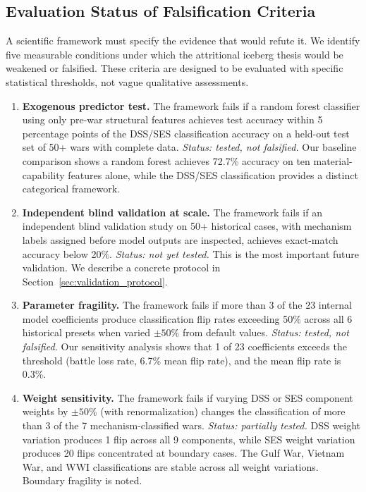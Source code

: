 \subsection{Evaluation Status of Falsification Criteria}\label{sec:falsification_status}

A scientific framework must specify the evidence that would refute it. We identify five measurable conditions under which the attritional iceberg thesis would be weakened or falsified. These criteria are designed to be evaluated with specific statistical thresholds, not vague qualitative assessments.

\begin{enumerate}
    \item \textbf{Exogenous predictor test.} The framework fails if a random forest classifier using only pre-war structural features achieves test accuracy within 5 percentage points of the DSS/SES classification accuracy on a held-out test set of 50+ wars with complete data. \textit{Status: tested, not falsified.} Our baseline comparison shows a random forest achieves 72.7\% accuracy on ten material-capability features alone, while the DSS/SES classification provides a distinct categorical framework.

    \item \textbf{Independent blind validation at scale.} The framework fails if an independent blind validation study on 50+ historical cases, with mechanism labels assigned before model outputs are inspected, achieves exact-match accuracy below 20\%. \textit{Status: not yet tested.} This is the most important future validation. We describe a concrete protocol in Section~\ref{sec:validation_protocol}.

    \item \textbf{Parameter fragility.} The framework fails if more than 3 of the 23 internal model coefficients produce classification flip rates exceeding 50\% across all 6 historical presets when varied $\pm 50\%$ from default values. \textit{Status: tested, not falsified.} Our sensitivity analysis shows that 1 of 23 coefficients exceeds the threshold (battle loss rate, 6.7\% mean flip rate), and the mean flip rate is 0.3\%.

    \item \textbf{Weight sensitivity.} The framework fails if varying DSS or SES component weights by $\pm 50\%$ (with renormalization) changes the classification of more than 3 of the 7 mechanism-classified wars. \textit{Status: partially tested.} DSS weight variation produces 1 flip across all 9 components, while SES weight variation produces 20 flips concentrated at boundary cases. The Gulf War, Vietnam War, and WWI classifications are stable across all weight variations. Boundary fragility is noted.


\end{enumerate}
